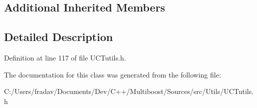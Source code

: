 \subsection*{Additional Inherited Members}


\subsection{Detailed Description}


Definition at line 117 of file U\-C\-Tutils.\-h.



The documentation for this class was generated from the following file\-:\begin{DoxyCompactItemize}
\item 
C\-:/\-Users/fradav/\-Documents/\-Dev/\-C++/\-Multiboost/\-Sources/src/\-Utils/U\-C\-Tutils.\-h\end{DoxyCompactItemize}
